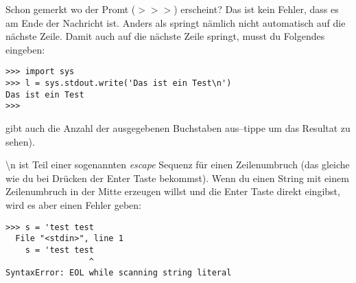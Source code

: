 Schon gemerkt wo der Promt ($>>>$) erscheint? Das ist kein Fehler, dass es am Ende der Nachricht ist. Anders als  springt nämlich  nicht automatisch auf die nächste Zeile. Damit  auch auf die nächste Zeile springt, musst du Folgendes eingeben:

\begin{Verbatim}[frame=single]
>>> import sys
>>> l = sys.stdout.write('Das ist ein Test\n')
Das ist ein Test
>>>
\end{Verbatim}

\noindent
 gibt auch die Anzahl der ausgegebenen Buchstaben aus--tippe  um das Resultat zu sehen).

\noindent
{\textbackslash}n ist Teil einer sogenannten \emph{escape} Sequenz für einen Zeilenumbruch (das gleiche wie du bei Drücken der Enter Taste bekommst). Wenn du einen String mit einem Zeilenumbruch in der Mitte erzeugen willst und die Enter Taste direkt eingibst, wird es aber einen Fehler geben: 

\begin{Verbatim}[frame=single]
>>> s = 'test test
  File "<stdin>", line 1
    s = 'test test
                 ^
SyntaxError: EOL while scanning string literal
\end{Verbatim}

